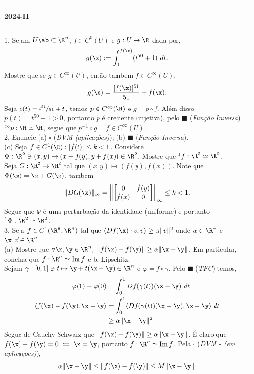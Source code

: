 \newpage 
\-\vspace{-0.3cm}
  {\hrule \vspace{-0.15cm}
  \centering \textbf{2024-II} \vspace{0.1cm}
  \hrule}

1. Sejam \(U\ab \subset \R^n\), \(f \in C^0(U)\) e \(g: U \to \R\) dada por, 
\[g(\x):= \int_0^{f(\x)} (t^{50} + 1) \ dt. \]
Mostre que se \(g \in C^\infty(U)\), então tambem \(f \in C^\infty(U)\).
\textcolor{gris}{
    \[g(\x) = \frac{[f(\x)]^{51}}{51} + f(\x). \]
Seja \(p(t) = \nicefrac{t^{51}}{51} + t\), temos \(p \in C^\infty(\R)\) e \(g = p \circ f \). Além disso, \(\dot{p}(t) = t^{50} + 1 > 0\), pontanto \(p\) é creciente (injetiva), pelo \(\blacksquare\) (\emph{Função Inversa}) \(^\infty p:\R\simeq \R\), segue que \( p^{-1} \circ g  = f \in C^\infty (U)\).  
}\hspace{-0.1cm}\\ 
2. Enuncie (a) \(\square\) (\emph{DVM (aplicações)}); (b) \(\blacksquare\) (\emph{Função Inversa}). \vspace{0.3cm}\\   
(c) Seja \(f \in C^1(\R) : |\dot{f}(t)| \leq k < 1\). Considere \(\Phi: \R^2 \ni (x,y) \mapsto (x + f(y), y + f(x)) \in \R^2\). Mostre que \(^1f: \R^2 \simeq \R^2\). \\ 
\textcolor{gris}{Seja \(G : \R^2 \to \R^2 \) tal que \((x,y) \mapsto (f(y), f(x))\). Note que \(\Phi(\x) = \x + G(\x) \), tambem 
\[\|DG(\x)\|_\infty = \left\| \begin{bmatrix} 0 & \dot{f}(y) \\ \dot{f}(x) & 0\end{bmatrix}\right\|_\infty \leq k <1.\]
Segue que \(\Phi\) é uma perturbação da identidade (uniforme) e portanto \(^1\Phi:\R^2\simeq \R^2\).   } \vspace{0.3cm}\\     
3. Seja \(f\in C^1(\R^n, \R^n)\) tal que \(\langle Df(\x)\cdot v , v\rangle \geq \alpha \|v\|^2\) onde \( \alpha\in \R^+ \) e \( \x, \vec{v} \in \R^n\). \vspace{0.3cm}\\ 
(a) Mostre que \(\forall \x,\y \in \R^n, \ \|f(\x) - f(\y)\| \geq \alpha \|\x-\y\|\). Em particular, conclua que \(f: \R^n \simeq \operatorname{Im}f\) e bi-Lipschitz.  \\ 
\textcolor{gris}{Sejam \(\gamma : [0,1] \ni t \mapsto \y + t(\x-\y) \in \R^n\) e \(\varphi = f \circ \gamma\). Pelo \(\blacksquare \) (\emph{TFC}) temos, 
\begin{align*} 
    \varphi(1) - \varphi(0) &= \int_0^1 Df(\gamma(t))(\x-\y) \ dt\\
    \langle f(\x) - f(\y), \x-\y\rangle  &=  \int_0^1 \langle Df(\gamma(t)) (\x-\y), \x-\y \rangle \ dt \\ 
    & \geq \alpha \|\x-\y\|^2
\end{align*}
Segue de Cauchy-Schwarz que \(\|f(\x) - f(\y)\| \geq \alpha \|\x-\y\|\). É claro que \(f(\x) -f(\y) = 0 \ \leftrightharpoons \ \x=\y\), portanto \(f: \R^n \simeq \operatorname{Im}f\). Pela \(\square\) (\emph{DVM - (em aplicações)}), 
\[\alpha \|\x-\y\| \leq \|f(\x) - f(\y)\| \leq M \|\x - \y\|.\]
    }   
